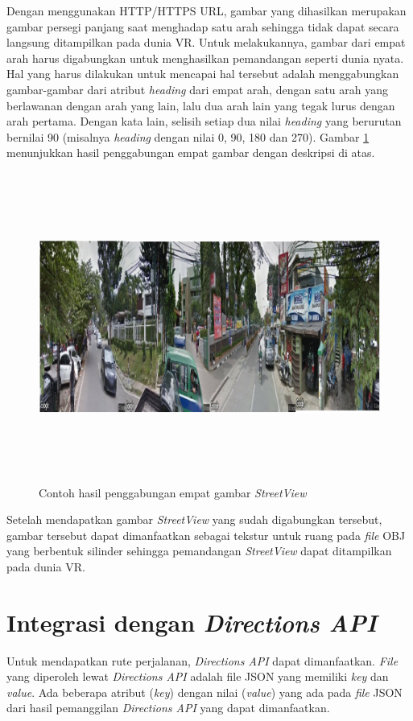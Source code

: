 Dengan menggunakan HTTP/HTTPS URL, gambar yang dihasilkan merupakan gambar persegi panjang saat menghadap satu arah sehingga tidak dapat secara langsung ditampilkan pada dunia VR. Untuk melakukannya, gambar dari empat arah harus digabungkan untuk menghasilkan pemandangan seperti  dunia nyata. Hal yang harus dilakukan untuk mencapai hal tersebut adalah menggabungkan gambar-gambar dari atribut \textit{heading} dari empat arah, dengan satu arah yang berlawanan dengan arah yang lain, lalu dua arah lain yang tegak lurus dengan arah pertama. Dengan kata lain, selisih setiap dua nilai \textit{heading} yang berurutan  bernilai 90 (misalnya \textit{heading} dengan nilai 0, 90, 180 dan 270). Gambar \ref{fig:streetview-vr} menunjukkan hasil penggabungan empat gambar dengan deskripsi di atas.

\begin{figure}[h]
	\centering
		\includegraphics[width=6.5in,height=4in]{Gambar/vr_streetview_sample.png}
	\caption{Contoh hasil penggabungan empat gambar \textit{StreetView}}
	\label{fig:streetview-vr}
\end{figure}

Setelah mendapatkan gambar \textit{StreetView} yang sudah digabungkan tersebut, gambar tersebut dapat dimanfaatkan sebagai tekstur untuk ruang pada \textit{file} OBJ yang berbentuk silinder sehingga pemandangan \textit{StreetView} dapat ditampilkan pada dunia VR.

\section{Integrasi dengan \textit{Directions API}}
Untuk mendapatkan rute perjalanan, \textit{Directions API} dapat dimanfaatkan. 
\textit{File} yang diperoleh lewat \textit{Directions API} adalah file JSON yang memiliki \textit{key} dan \textit{value}. Ada beberapa atribut (\textit{key}) dengan nilai (\textit{value}) yang ada pada \textit{file} JSON dari hasil pemanggilan \textit{Directions API} yang dapat dimanfaatkan.

